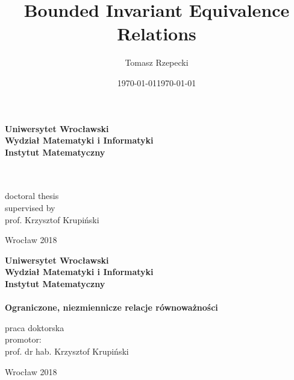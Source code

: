 \documentclass[12pt,a4paper,final]{book}
\date{\today}
\title{Bounded Invariant Equivalence Relations}
\author{Tomasz Rzepecki}
\date{\today}
\theoremstyle{remark}
\theoremstyle{definition}
\begin{document}
	\newpage
	\thispagestyle{empty}
	\makeatletter
	\begin{center}
		\textbf{\large Uniwersytet Wrocławski\\
			Wydział Matematyki i Informatyki\\
			Instytut Matematyczny}\\
		\vspace{4cm}
		\textbf{\textit{\large \@author}\\
			\vspace{0.5cm}
			{\Large \@title}}\\
	\end{center}
	\vspace{3cm}
	{\large \hspace*{6.5cm}doctoral thesis\\
		\hspace*{6.5cm}supervised by\\
		\hspace*{6.5cm}prof. Krzysztof Krupiński}\\
	\vfill
	\begin{center}
		{\large Wrocław 2018}\\
	\end{center}
	\makeatother
	\newpage
	\thispagestyle{empty}
	\makeatletter
	\begin{center}
		\textbf{\large Uniwersytet Wrocławski\\
			Wydział Matematyki i Informatyki\\
			Instytut Matematyczny}\\
		\vspace{4cm}
		\textbf{\textit{\large \@author}\\
			\vspace{0.5cm}
			{\Large Ograniczone, niezmiennicze relacje równoważności}}\\
	\end{center}
	\vspace{3cm}
	{\large \hspace*{6.5cm}praca doktorska\\
		\hspace*{6.5cm}promotor:\\
		\hspace*{6.5cm}prof. dr hab. Krzysztof Krupiński}\\
	\vfill
	\begin{center}
		{\large Wrocław 2018}\\
	\end{center}
	\makeatother
	\newpage
	
\end{document}
